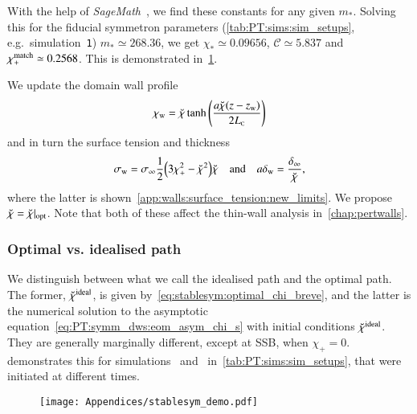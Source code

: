 With the help of \textit{SageMath}~\citep{sagemath}, we find these constants for any given $m_\ast$. 
Solving this for the fiducial symmetron parameters (\cref{tab:PT:sims:sim_setups}, e.g.~simulation~\texttt{1}) %
$m_\ast \simeq 268.36$, we get $\chi_\ast \simeq 0.09656$, $\mathcal{C}\simeq 5.837$ and $\chi_+^\mathrm{match}\simeq 0.2568$. This is demonstrated in~\cref{fig:stablesym:computation:stablesym_demo}. 



We update the domain wall profile
\begin{equation}\label{eq:stablesym:chi_w_quasistatic_FLRW_updated}
    \chi_\mathrm{w} = \breve{\chi} \tanh{{\left(  \frac{a\breve{\chi}(z-z\ensuremath{_\mathrm{w}})}{2L_{\text{\tiny{C}}}}  \right)}}
\end{equation}
and in turn the surface tension and thickness
\begin{equation}
    \sigma_\mathrm{w} = \sigma_\infty \frac{1}{2} {\left(  3\chi_+^2- \breve{\chi}^2  \right)}\breve{\chi} \quad\text{and}\quad a\delta_\mathrm{w} = \frac{\delta_\infty}{\breve{\chi}} ,
\end{equation}
where the latter is shown~\cref{app:walls:surface_tension:new_limits}. We propose $\breve{\chi}= \breve{\chi}\rvert_\mathrm{opt}$. %
Note that both of these affect the thin-wall analysis in~\cref{chap:pertwalls}.




\subsubsection{Optimal vs. idealised path}
    We distinguish between what we call the idealised path and the optimal path. The former, $\breve{\chi}^\mathrm{ideal}$, is given by~\cref{eq:stablesym:optimal_chi_breve}, and the latter is the numerical solution to the asymptotic equation~\cref{eq:PT:symm_dws:eom_asym_chi_s} with initial conditions $\breve{\chi}^\mathrm{ideal}$. They are generally marginally different, except at SSB, when $\chi_+ = 0$.  demonstrates this for simulations~ and~ in~\cref{tab:PT:sims:sim_setups}, that were initiated at different times.
    \begin{figure}[h!]
        \centering
        \texttt{[image: Appendices/stablesym\_demo.pdf]}
        \caption{}
        \label{fig:stablesym:computation:stablesym_demo}
    \end{figure}%

